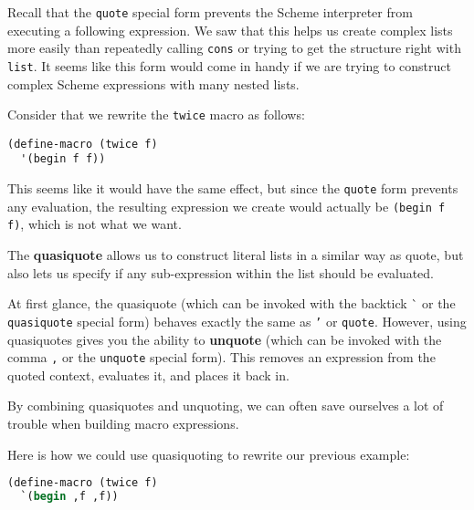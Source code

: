 
Recall that the \texttt{quote} special form prevents the Scheme interpreter
from executing a following expression. We saw that this helps us create complex
lists more easily than repeatedly calling \texttt{cons} or trying to get the
structure right with \texttt{list}. It seems like this form would come in handy
if we are trying to construct complex Scheme expressions with many nested
lists.

Consider that we rewrite the \texttt{twice} macro as follows:

\begin{lstlisting}
(define-macro (twice f)
  '(begin f f))
\end{lstlisting}

This seems like it would have the same effect, but since the \texttt{quote}
form prevents any evaluation, the resulting expression we create would actually
be \texttt{(begin f f)}, which is not what we want.

The \textbf{quasiquote} allows us to construct literal lists in a similar way
as quote, but also lets us specify if any sub-expression within the list should be
evaluated.

At first glance, the quasiquote (which can be invoked with the backtick \`{} or
the \texttt{quasiquote} special form) behaves exactly the same as \texttt{'} or
\texttt{quote}.  However, using quasiquotes gives you the ability to
\textbf{unquote} (which can be invoked with the comma \texttt{,} or the
\texttt{unquote} special form). This removes an expression from the quoted
context, evaluates it, and places it back in.

By combining quasiquotes and unquoting, we can often save ourselves a lot
of trouble when building macro expressions.

Here is how we could use quasiquoting to rewrite our previous example:
\begin{lstlisting}[language=Scheme]
(define-macro (twice f)
  `(begin ,f ,f))
\end{lstlisting}
